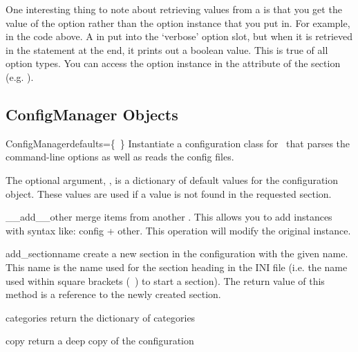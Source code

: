 One interesting thing to note about retrieving values from a 
 is that you get the value of the option
rather than the option instance that you put in.  For example, in the
code above.  A  in put into the `verbose' option
slot, but when it is retrieved in the  statement at
the end, it prints out a boolean value.  This is true of all option
types.  You can access the option instance in the  attribute
of the section (e.g. ).


\subsection{ConfigManager Objects}

\begin{classdesc}{ConfigManager}{defaults=\{~\}}
Instantiate a configuration class for \plasTeX\ that parses the command-line options
as well as reads the config files.  

The optional argument, ,
is a dictionary of default values for the configuration object.  These 
values are used if a value is not found in the requested section.
\end{classdesc}

\begin{methoddesc}[ConfigManager]{__add__}{other}
merge items from another .  This allows you to add
 instances with syntax like: config + other. 
This operation will modify the original instance.
\end{methoddesc}

\begin{methoddesc}[ConfigManager]{add_section}{name}
create a new section in the configuration with the given name.  This 
name is the name used for the section heading in the INI file (i.e. the
name used within square brackets (\lbrack~\rbrack) to start a section).
The return value of this method is a reference to the newly created section.  
\end{methoddesc}

\begin{methoddesc}[ConfigManager]{categories}{}
return the dictionary of categories
\end{methoddesc}

\begin{methoddesc}[ConfigManager]{copy}{}
return a deep copy of the configuration
\end{methoddesc}

